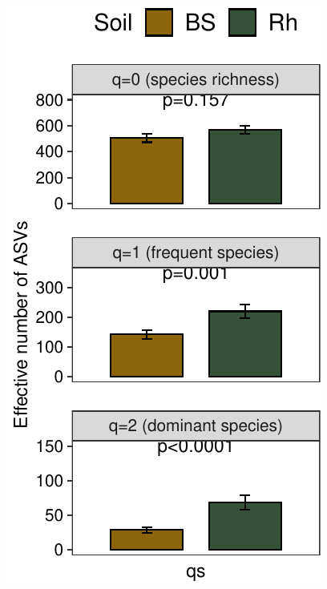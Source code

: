 \documentclass[]{interact}
\theoremstyle{plain}%
\theoremstyle{definition}
\theoremstyle{remark}
\begin{document}
\begin{center}\includegraphics{Doc_pdf_files/figure-latex/unnamed-chunk-22-1} \end{center}
\end{document}
